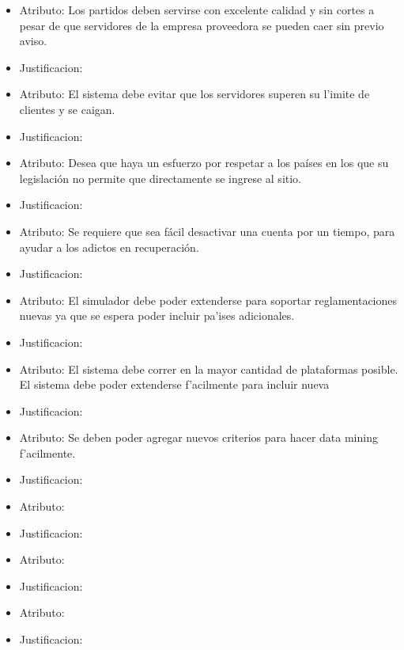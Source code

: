 \begin{itemize}
\item Atributo: Los partidos deben servirse con excelente calidad y sin cortes a pesar de que servidores de la empresa proveedora se pueden caer sin previo aviso.
\item Justificacion:


\item Atributo: El sistema debe evitar que los servidores superen su l'imite de clientes y se caigan.
\item Justificacion:

\item Atributo: Desea que haya un esfuerzo por respetar a los países en los que su legislación no permite que directamente se ingrese al sitio.
\item Justificacion:

\item Atributo: Se requiere que sea fácil desactivar una cuenta por un tiempo, para ayudar a los adictos en recuperación.
\item Justificacion:

\item Atributo: El simulador debe poder extenderse para soportar reglamentaciones nuevas ya que se espera poder incluir pa'ises adicionales.
\item Justificacion:

\item Atributo: El sistema debe correr en la mayor cantidad de plataformas posible. El sistema debe poder extenderse f'acilmente para incluir nueva
\item Justificacion:

\item Atributo: Se deben poder agregar nuevos criterios para hacer data mining f'acilmente.
\item Justificacion:

\item Atributo: 
\item Justificacion:

\item Atributo: 
\item Justificacion:

\item Atributo: 
\item Justificacion:
\end{itemize}

